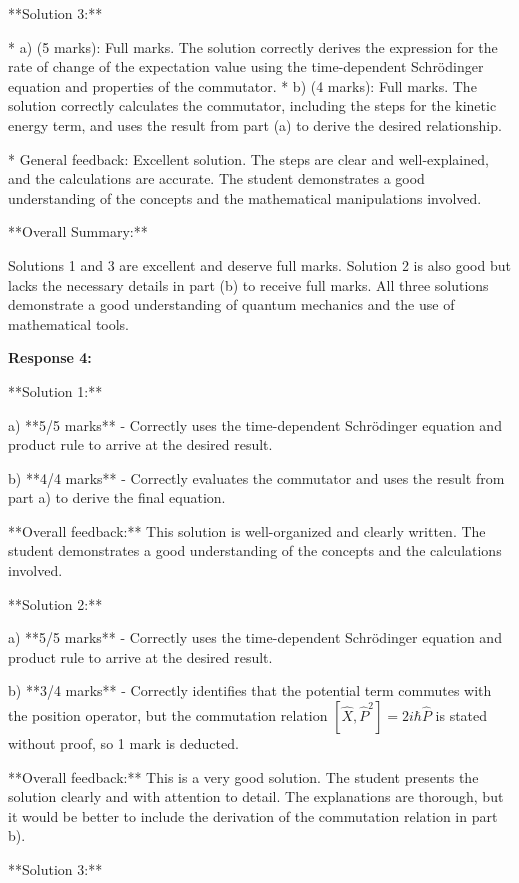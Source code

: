\documentclass[a4paper,11pt]{article}
\begin{document}
**Solution 3:**

* a) (5 marks): Full marks. The solution correctly derives the expression for the rate of change of the expectation value using the time-dependent Schrödinger equation and properties of the commutator.
* b) (4 marks): Full marks. The solution correctly calculates the commutator, including the steps for the kinetic energy term, and uses the result from part (a) to derive the desired relationship.

* General feedback: Excellent solution. The steps are clear and well-explained, and the calculations are accurate. The student demonstrates a good understanding of the concepts and the mathematical manipulations involved.

**Overall Summary:**

Solutions 1 and 3 are excellent and deserve full marks. Solution 2 is also good but lacks the necessary details in part (b) to receive full marks. All three solutions demonstrate a good understanding of quantum mechanics and the use of mathematical tools.

\textbf{Response 4:}

**Solution 1:**

a) **5/5 marks** - Correctly uses the time-dependent Schrödinger equation and product rule to arrive at the desired result.

b) **4/4 marks** - Correctly evaluates the commutator and uses the result from part a) to derive the final equation.

**Overall feedback:** This solution is well-organized and clearly written. The student demonstrates a good understanding of the concepts and the calculations involved.

**Solution 2:**

a) **5/5 marks** - Correctly uses the time-dependent Schrödinger equation and product rule to arrive at the desired result.

b) **3/4 marks** - Correctly identifies that the potential term commutes with the position operator, but the commutation relation \( \left[ \hat{X}, \hat{P}^2 \right] = 2i\hbar\hat{P} \) is stated without proof, so 1 mark is deducted.

**Overall feedback:** This is a very good solution. The student presents the solution clearly and with attention to detail. The explanations are thorough, but it would be better to include the derivation of the commutation relation in part b).

**Solution 3:**
\end{document}
